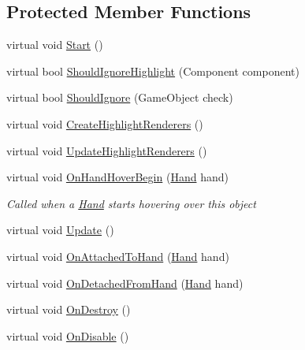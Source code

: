 \subsection*{Protected Member Functions}
\begin{DoxyCompactItemize}
\item 
virtual void \mbox{\hyperlink{class_valve_1_1_v_r_1_1_interaction_system_1_1_interactable_aef61a645fffad29d9a6865ca38026a89}{Start}} ()
\item 
virtual bool \mbox{\hyperlink{class_valve_1_1_v_r_1_1_interaction_system_1_1_interactable_aa80dd17da786ba7b76a0c6a713f6443e}{Should\+Ignore\+Highlight}} (Component component)
\item 
virtual bool \mbox{\hyperlink{class_valve_1_1_v_r_1_1_interaction_system_1_1_interactable_a7097ad808a2fec8c884e31c81de46198}{Should\+Ignore}} (Game\+Object check)
\item 
virtual void \mbox{\hyperlink{class_valve_1_1_v_r_1_1_interaction_system_1_1_interactable_ae90583dd7a15aecc2cdb8b1640c6ac44}{Create\+Highlight\+Renderers}} ()
\item 
virtual void \mbox{\hyperlink{class_valve_1_1_v_r_1_1_interaction_system_1_1_interactable_a1dad43cca9e520121e707ff18340dd0a}{Update\+Highlight\+Renderers}} ()
\item 
virtual void \mbox{\hyperlink{class_valve_1_1_v_r_1_1_interaction_system_1_1_interactable_a763e6964143b0de95520d50f5192fee6}{On\+Hand\+Hover\+Begin}} (\mbox{\hyperlink{class_valve_1_1_v_r_1_1_interaction_system_1_1_hand}{Hand}} hand)
\begin{DoxyCompactList}\small\item\em Called when a \mbox{\hyperlink{class_valve_1_1_v_r_1_1_interaction_system_1_1_hand}{Hand}} starts hovering over this object \end{DoxyCompactList}\item 
virtual void \mbox{\hyperlink{class_valve_1_1_v_r_1_1_interaction_system_1_1_interactable_a4da06a25433c660a51df6bcf7caf1c12}{Update}} ()
\item 
virtual void \mbox{\hyperlink{class_valve_1_1_v_r_1_1_interaction_system_1_1_interactable_a0afd06a107877372ec2b4ea5705df3d5}{On\+Attached\+To\+Hand}} (\mbox{\hyperlink{class_valve_1_1_v_r_1_1_interaction_system_1_1_hand}{Hand}} hand)
\item 
virtual void \mbox{\hyperlink{class_valve_1_1_v_r_1_1_interaction_system_1_1_interactable_af0c021201187d64f34c28122b6d39949}{On\+Detached\+From\+Hand}} (\mbox{\hyperlink{class_valve_1_1_v_r_1_1_interaction_system_1_1_hand}{Hand}} hand)
\item 
virtual void \mbox{\hyperlink{class_valve_1_1_v_r_1_1_interaction_system_1_1_interactable_a229fd3f673c88a917fa40faa228e3b5f}{On\+Destroy}} ()
\item 
virtual void \mbox{\hyperlink{class_valve_1_1_v_r_1_1_interaction_system_1_1_interactable_a410b0986667094a1437b1669b7dd6cbe}{On\+Disable}} ()
\end{DoxyCompactItemize}
